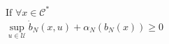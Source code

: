 \documentclass[preview]{standalone}
\begin{document}
\begin{align*}
\text{If }\forall x \in \mathcal{C}^*\\ \sup_{u \in \mathcal{U}} \dot b_N(x, u) + \alpha_N(b_N(x)) \geq 0
\end{align*}
\end{document}
